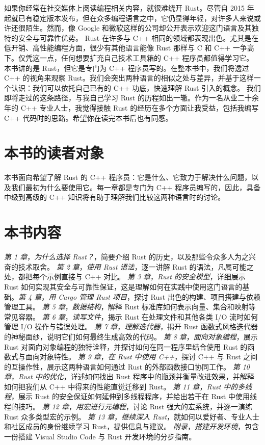 如果你经常在社交媒体上阅读编程相关内容，就很难绕开 Rust。尽管自 2015 年起就已有稳定版本发布，但在众多编程语言之中，它仍显得年轻，对许多人来说或许还很陌生。然而，像 Google 和微软这样的公司却公开表示欢迎这门语言及其独特的安全与可靠性优势。
Rust 在许多与 C++ 相同的领域都表现出色。尤其是在低开销、高性能编程方面，很少有其他语言能像 Rust 那样与 C 和 C++ 一争高下。仅凭这一点，任何想要扩充自己技术工具箱的 C++ 程序员都值得学习它。
本书讲的是 Rust，但它是专门为 C++ 程序员写的。在整本书中，我们将透过 C++ 的视角来观察 Rust。我们会突出两种语言的相似之处与差异，并基于这样一个认识：我们可以依托自己已有的 C++ 功底，快速理解 Rust 引入的概念。
我们即将走过的这条路径，与我自己学习 Rust 的历程如出一辙。作为一名从业二十余年的 C++ 专业人士，我觉得接触 Rust 的经历在多个方面让我受益，包括我编写 C++ 代码时的思路。希望你在读完本书后也有同感。
\section{本书的读者对象}
本书面向希望了解 Rust 的 C++ 程序员：它是什么、它致力于解决什么问题，以及我们最初为什么要使用它。每一章都是专门为 C++ 程序员编写的，因此，具备中级到高级的 C++ 知识将有助于理解我们比较这两种语言时的讨论。
\section{本书内容}
\emph{第 1 章}，\emph{为什么选择 Rust？}，简要介绍 Rust 的历史，以及那些令众多人为之兴奋的技术取舍。
\emph{第 2 章}，\emph{使用 Rust 语法}，逐一讲解 Rust 的语法，凡属可能之处，都把每个示例直接与 C++ 对比。
\emph{第 3 章}，\emph{Rust 的安全模型}，详细展示 Rust 如何实现其安全与可靠性保证，这是理解如何在实践中使用这门语言的基础。\emph{第 4 章}，\emph{用 Cargo 管理 Rust 项目}，探讨 Rust 出色的构建、项目搭建与依赖管理工具。
\emph{第 5 章}，\emph{数据结构}，解释 Rust 标准库如何表示向量、集合和映射等常见容器。
\emph{第 6 章}，\emph{读写文件}，揭示 Rust 在处理文件和其他各类 I/\allowbreak{}O 流时如何管理 I/\allowbreak{}O 操作与错误处理。
\emph{第 7 章}，\emph{理解迭代器}，揭开 Rust 函数式风格迭代器的神秘面纱，说明它们如何最终生成高效的代码。
\emph{第 8 章}，\emph{面向对象编程}，展示 Rust 对面向对象编程的独特诠释，并探讨如何在同一程序里结合使用 Rust 的函数式与面向对象特性。
\emph{第 9 章}，\emph{在 Rust 中使用 C++}，探讨 C++ 与 Rust 之间的互操作性，展示这两种语言如何通过 Rust 的外部函数接口协同工作。
\emph{第 10 章}，\emph{Rust 中的优化}，详述如何找出 Rust 程序中的瓶颈并衡量改进效果，并解释如何把我们从 C++ 中得来的性能直觉迁移到 Rust。
\emph{第 11 章}，\emph{Rust 中的多线程}，展示 Rust 的安全保证如何延伸到多线程程序，并给出若干在 Rust 中使用线程的技巧。
\emph{第 12 章}，\emph{用宏进行元编程}，讨论 Rust 强大的宏系统，并逐一演练 Rust 众多类型宏的示例。
\emph{第 13 章}，\emph{继续深入 Rust}，就如何以爱好者、专业人士和社区成员的身份继续学习 Rust，提供信息与建议。
\emph{附录}，\emph{搭建开发环境}，包含一份搭建 Visual Studio Code 与 Rust 开发环境的分步指南。
